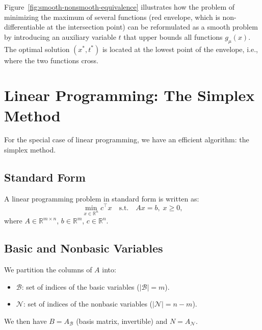 \begin{figureexplanation}
Figure~\ref{fig:smooth-nonsmooth-equivalence} illustrates how the problem of minimizing the maximum of several functions (red envelope, which is non-differentiable at the intersection point) can be reformulated as a smooth problem by introducing an auxiliary variable $t$ that upper bounds all functions $g_\mu(x)$. The optimal solution $(x^*, t^*)$ is located at the lowest point of the envelope, i.e., where the two functions cross.
\end{figureexplanation}

\section{Linear Programming: The Simplex Method}
\label{sec:simplex-method}

For the special case of linear programming, we have an efficient algorithm: the simplex method.

\subsection{Standard Form}

A linear programming problem in standard form is written as:
\begin{equation}
    \min_{x \in \mathbb{R}^n} c^\top x \quad \text{s.t.} \quad Ax = b, \; x \geq 0,
\end{equation}
where $A \in \mathbb{R}^{m \times n}$, $b \in \mathbb{R}^m$, $c \in \mathbb{R}^n$.

\subsection{Basic and Nonbasic Variables}

We partition the columns of $A$ into:
\begin{itemize}
    \item $\mathcal{B}$: set of indices of the basic variables ($|\mathcal{B}| = m$).
    \item $\mathcal{N}$: set of indices of the nonbasic variables ($|\mathcal{N}| = n - m$).
\end{itemize}

We then have $B = A_{\mathcal{B}}$ (basis matrix, invertible) and $N = A_{\mathcal{N}}$.

